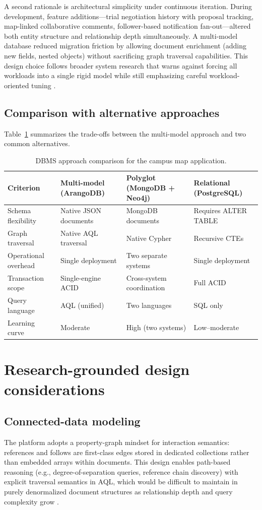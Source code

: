 \documentclass[13pt,a4paper]{report}
\begin{document}
A second rationale is architectural simplicity under continuous iteration. During development, feature additions---trial negotiation history with proposal tracking, map-linked collaborative comments, follower-based notification fan-out---altered both entity structure and relationship depth simultaneously. A multi-model database reduced migration friction by allowing document enrichment (adding new fields, nested objects) without sacrificing graph traversal capabilities. This design choice follows broader system research that warns against forcing all workloads into a single rigid model while still emphasizing careful workload-oriented tuning \cite{stonebraker2005onesize}.

\subsection{Comparison with alternative approaches}
Table~\ref{tab:dbms-comparison} summarizes the trade-offs between the multi-model approach and two common alternatives.

\begin{table}[!htbp]
\centering
\caption{DBMS approach comparison for the campus map application.}
\label{tab:dbms-comparison}
\begin{tabularx}{\textwidth}{l X X X}
\toprule
\textbf{Criterion} & \textbf{Multi-model (ArangoDB)} & \textbf{Polyglot (MongoDB + Neo4j)} & \textbf{Relational (PostgreSQL)} \\
\midrule
Schema flexibility & Native JSON documents & MongoDB documents & Requires ALTER TABLE \\
Graph traversal & Native AQL traversal & Native Cypher & Recursive CTEs \\
Operational overhead & Single deployment & Two separate systems & Single deployment \\
Transaction scope & Single-engine ACID & Cross-system coordination & Full ACID \\
Query language & AQL (unified) & Two languages & SQL only \\
Learning curve & Moderate & High (two systems) & Low--moderate \\
\bottomrule
\end{tabularx}
\end{table}

\section{Research-grounded design considerations}
\subsection{Connected-data modeling}
The platform adopts a property-graph mindset for interaction semantics: references and follows are first-class edges stored in dedicated collections rather than embedded arrays within documents. This design enables path-based reasoning (e.g., degree-of-separation queries, reference chain discovery) with explicit traversal semantics in AQL, which would be difficult to maintain in purely denormalized document structures as relationship depth and query complexity grow \cite{robinson2015graph}.
\end{document}
